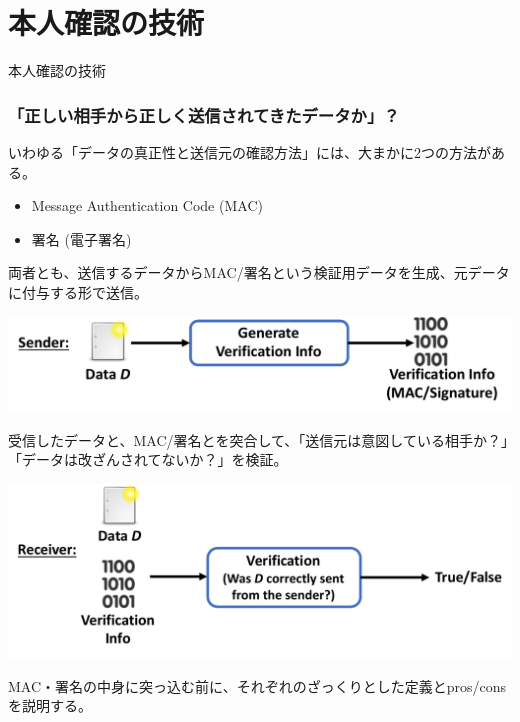 \documentclass[12pt,dvipdfmx]{beamer}
\begin{document}
\section{本人確認の技術}
\begin{frame}
\centering
{\Large 本人確認の技術}
\end{frame}

\begin{frame}
\frametitle{「正しい相手から正しく送信されてきたデータか」？}
いわゆる「データの真正性と送信元の確認方法」には、大まかに2つの方法がある。
\begin{itemize}
 \item Message Authentication Code (MAC)
 \item 署名 (電子署名)
\end{itemize}

\end{frame}

\begin{frame}
両者とも、送信するデータからMAC/署名という検証用データを生成、元データに付与する形で送信。
\begin{center}
 \includegraphics[width=0.75\linewidth]{Figs/mac-sig-flow01.pdf}
\end{center}
受信したデータと、MAC/署名とを突合して、「送信元は意図している相手か？」「データは改ざんされてないか？」を検証。
\begin{center}
 \includegraphics[width=0.75\linewidth]{Figs/mac-sig-flow02.pdf}
\end{center}
\end{frame}

\begin{frame}
MAC・署名の中身に突っ込む前に、それぞれのざっくりとした定義とpros/consを説明する。
\end{frame}
\end{document}
